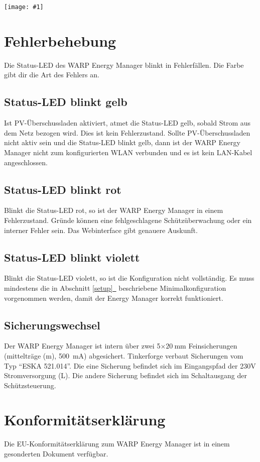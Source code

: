 \documentclass[a4paper,10pt]{article}
\newcommand{\gfx}[1]{\texttt{[image: \#1]}}
\newcommand*{\fullref}[1]{Abschnitt \hyperref[{#1}]{\ref*{#1}~\nameref*{#1}}}
\begin{document}
\begin{multicols*}{2}
	\gfx{./img/resized/factory_reset_2}

	\newpage
	\section{Fehlerbehebung}
	\label{fehlerbehebung}
	Die Status-LED des WARP Energy Manager blinkt in Fehlerfällen. Die Farbe gibt dir die Art des Fehlers an.
	\subsection{Status-LED blinkt gelb}
	Ist PV-Überschussladen aktiviert, atmet die Status-LED gelb, sobald Strom
	aus dem Netz bezogen wird. Dies ist kein Fehlerzustand.
	Sollte PV-Überschussladen nicht aktiv sein und die Status-LED blinkt gelb,
	dann ist der WARP Energy Manager nicht zum konfigurierten WLAN verbunden und es ist kein LAN-Kabel angeschlossen.

	\subsection{Status-LED blinkt rot}
	Blinkt die Status-LED rot, so ist der WARP Energy Manager in einem
	Fehlerzustand. Gründe können eine fehlgeschlagene Schützüberwachung oder ein
	interner Fehler sein. Das Webinterface gibt genauere Auskunft.

	\subsection{Status-LED blinkt violett}
	Blinkt die Status-LED violett, so ist die Konfiguration nicht vollständig. Es muss mindestens die in \fullref{setup} beschriebene Minimalkonfiguration vorgenommen werden, damit der Energy Manager korrekt funktioniert.

	\subsection{Sicherungswechsel}
	Der WARP Energy Manager ist intern über zwei 5$\times\SI{20}{\milli\meter}$ Feinsicherungen (mittelträge (m), \SI{500}{\milli\ampere}) abgesichert.
	Tinkerforge verbaut Sicherungen vom Typ \enquote{ESKA 521.014}. Die eine
	Sicherung befindet sich im Eingangspfad der 230V Stromversorgung (L). Die
	andere Sicherung befindet sich im Schaltausgang der Schützsteuerung.

	\section{Konformitätserklärung}
	Die EU-Konformitätserklärung zum WARP Energy Manager ist in einem gesonderten Dokument verfügbar.


\end{multicols*}
\end{document}
